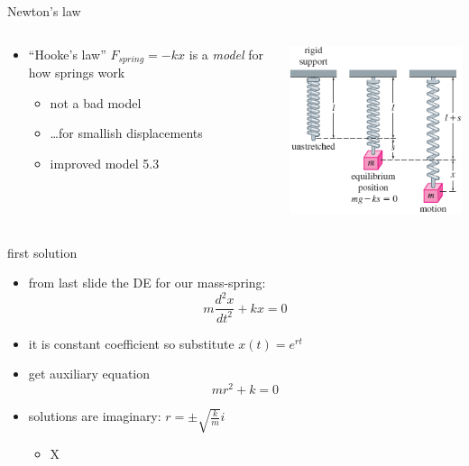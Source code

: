 \documentclass{beamer}
\begin{document}
\begin{frame}{Newton's law}
\begin{columns}
\begin{column}{0.65\textwidth}
\begin{itemize}
\item ``Hooke's law'' $F_{spring} = -kx$ is a \emph{model} for how springs work
    \begin{itemize}
    \item not a bad model
    \item \dots for smallish displacements
    \item improved model 5.3
    \end{itemize}
\end{itemize}
\end{column}
\begin{column}{0.35\textwidth}
\includegraphics[width=\textwidth]{figs/mass-spring-setup}
\end{column}
\end{columns}
\end{frame}


\begin{frame}{first solution}

\begin{itemize}
\item from last slide the DE for our mass-spring:
    $$m \frac{d^2x}{dt^2} + k x = 0$$
\item it is constant coefficient so substitute $x(t)=e^{rt}$
\item get auxiliary equation
    $$m r^2 + k = 0$$
\item solutions are imaginary: $r = \pm \sqrt{\frac{k}{m}} i$
    \begin{itemize}
    \item X
    \end{itemize}
\end{itemize}
\end{frame}
\end{document}
